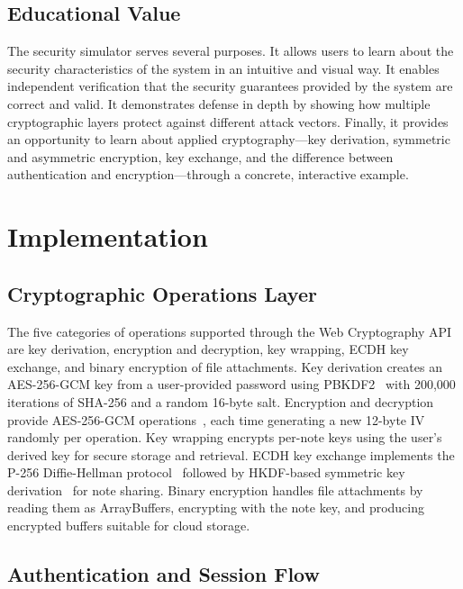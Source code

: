 \documentclass[conference]{IEEEtran}
\begin{document}
\subsection{Educational Value}

The security simulator serves several purposes. It allows users to learn about the security characteristics of the system in an intuitive and visual way. It enables independent verification that the security guarantees provided by the system are correct and valid. It demonstrates defense in depth by showing how multiple cryptographic layers protect against different attack vectors. Finally, it provides an opportunity to learn about applied cryptography---key derivation, symmetric and asymmetric encryption, key exchange, and the difference between authentication and encryption---through a concrete, interactive example.

\section{Implementation}

\subsection{Cryptographic Operations Layer}

The five categories of operations supported through the Web Cryptography API~\cite{ref1} are key derivation, encryption and decryption, key wrapping, ECDH key exchange, and binary encryption of file attachments. Key derivation creates an AES-256-GCM key from a user-provided password using PBKDF2~\cite{ref3} with 200,000 iterations of SHA-256 and a random 16-byte salt. Encryption and decryption provide AES-256-GCM operations~\cite{ref2}, each time generating a new 12-byte IV randomly per operation. Key wrapping encrypts per-note keys using the user's derived key for secure storage and retrieval. ECDH key exchange implements the P-256 Diffie-Hellman protocol~\cite{ref7} followed by HKDF-based symmetric key derivation~\cite{ref4} for note sharing. Binary encryption handles file attachments by reading them as ArrayBuffers, encrypting with the note key, and producing encrypted buffers suitable for cloud storage.

\subsection{Authentication and Session Flow}
\end{document}
